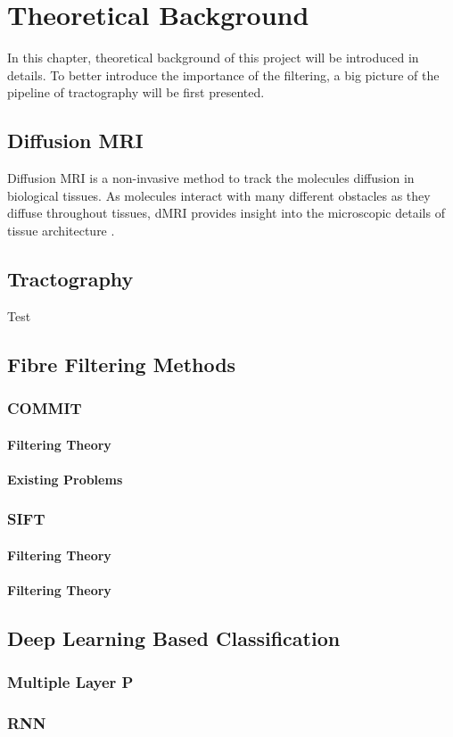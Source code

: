\chapter{Theoretical Background}


In this chapter, theoretical background of this project will be introduced in details. To better introduce the importance of the filtering, a big picture of the pipeline of tractography will be first presented. 

\section{Diffusion MRI}

Diffusion MRI is a non-invasive method to track the molecules diffusion in biological tissues. As molecules interact with many different obstacles as they diffuse throughout tissues, dMRI provides insight into the microscopic details of tissue architecture \cite{newmanChapterMorphologicalBrain2014}. 

\section{Tractography}

Test \autocite{dhollanderFixelbasedAnalysisDiffusion2021}


\section{Fibre Filtering Methods}

\subsection{COMMIT}

\subsubsection{Filtering Theory}

\subsubsection{Existing Problems}

\subsection{SIFT}

\subsubsection{Filtering Theory}

\subsubsection{Filtering Theory}

\section{Deep Learning Based Classification}

\subsection{Multiple Layer P}
\subsection{RNN}




